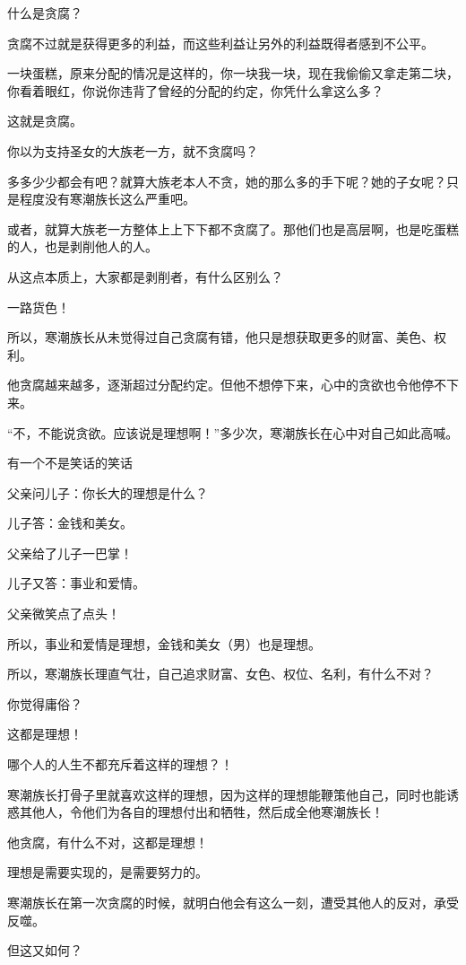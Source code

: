 \begin{this_body}
什么是贪腐？

贪腐不过就是获得更多的利益，而这些利益让另外的利益既得者感到不公平。

一块蛋糕，原来分配的情况是这样的，你一块我一块，现在我偷偷又拿走第二块，你看着眼红，你说你违背了曾经的分配的约定，你凭什么拿这么多？

这就是贪腐。

你以为支持圣女的大族老一方，就不贪腐吗？

多多少少都会有吧？就算大族老本人不贪，她的那么多的手下呢？她的子女呢？只是程度没有寒潮族长这么严重吧。

或者，就算大族老一方整体上上下下都不贪腐了。那他们也是高层啊，也是吃蛋糕的人，也是剥削他人的人。

从这点本质上，大家都是剥削者，有什么区别么？

一路货色！

所以，寒潮族长从未觉得过自己贪腐有错，他只是想获取更多的财富、美色、权利。

他贪腐越来越多，逐渐超过分配约定。但他不想停下来，心中的贪欲也令他停不下来。

“不，不能说贪欲。应该说是理想啊！”多少次，寒潮族长在心中对自己如此高喊。

有一个不是笑话的笑话

父亲问儿子：你长大的理想是什么？

儿子答：金钱和美女。

父亲给了儿子一巴掌！

儿子又答：事业和爱情。

父亲微笑点了点头！

所以，事业和爱情是理想，金钱和美女（男）也是理想。

所以，寒潮族长理直气壮，自己追求财富、女色、权位、名利，有什么不对？

你觉得庸俗？

这都是理想！

哪个人的人生不都充斥着这样的理想？！

寒潮族长打骨子里就喜欢这样的理想，因为这样的理想能鞭策他自己，同时也能诱惑其他人，令他们为各自的理想付出和牺牲，然后成全他寒潮族长！

他贪腐，有什么不对，这都是理想！

理想是需要实现的，是需要努力的。

寒潮族长在第一次贪腐的时候，就明白他会有这么一刻，遭受其他人的反对，承受反噬。

但这又如何？


\end{this_body}
